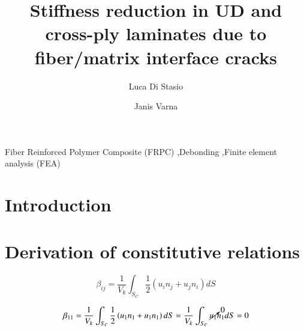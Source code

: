 \documentclass[review]{elsarticle}
\begin{document}
\begin{frontmatter}

\title{Stiffness reduction in UD and cross-ply laminates due to fiber/matrix interface cracks}


\author[lulea]{Luca Di Stasio}
\author[lulea]{Janis Varna}


\address[lulea]{Lule\aa\ University of Technology, University Campus, SE-97187 Lule\aa, Sweden}


\begin{abstract}

\end{abstract}

\begin{keyword}
Fiber Reinforced Polymer Composite (FRPC) \sep Debonding \sep Finite element analysis (FEA)
\end{keyword}

\end{frontmatter}

\linenumbers

\section{Introduction}

\section{Derivation of constitutive relations}

\begin{equation}
\beta_{ij}=\frac{1}{V_{k}}\int_{S_{C}}\frac{1}{2}\left(u_{i}n_{j}+u_{j}n_{i}\right)dS
\end{equation}

\begin{equation}
\beta_{11}=\frac{1}{V_{k}}\int_{S_{C}}\frac{1}{2}\left(u_{1}n_{1}+u_{1}n_{1}\right)dS=\frac{1}{V_{k}}\int_{S_{C}}\cancelto{0}{u_{1}}n_{1}dS=0
\end{equation}
\end{document}

